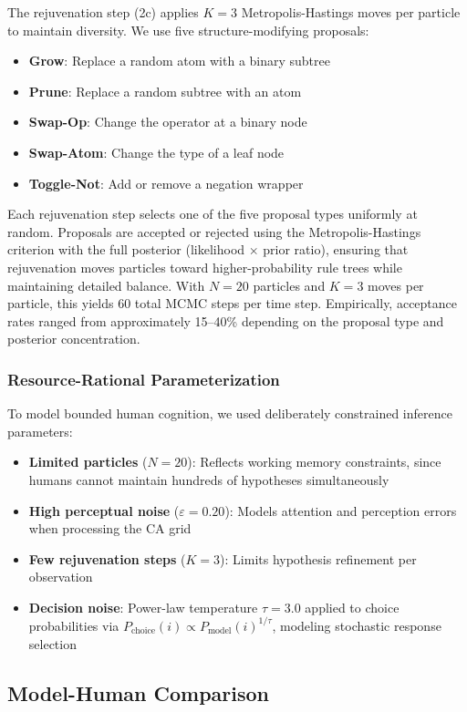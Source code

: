 \documentclass[10pt,letterpaper]{article}
\begin{document}
The rejuvenation step (2c) applies $K=3$ Metropolis-Hastings moves per particle to maintain diversity. We use five structure-modifying proposals:
\begin{itemize}
    \item \textbf{Grow}: Replace a random atom with a binary subtree
    \item \textbf{Prune}: Replace a random subtree with an atom
    \item \textbf{Swap-Op}: Change the operator at a binary node
    \item \textbf{Swap-Atom}: Change the type of a leaf node
    \item \textbf{Toggle-Not}: Add or remove a negation wrapper
\end{itemize}
Each rejuvenation step selects one of the five proposal types uniformly at random. Proposals are accepted or rejected using the Metropolis-Hastings criterion with the full posterior (likelihood $\times$ prior ratio), ensuring that rejuvenation moves particles toward higher-probability rule trees while maintaining detailed balance. With $N = 20$ particles and $K = 3$ moves per particle, this yields 60 total MCMC steps per time step. Empirically, acceptance rates ranged from approximately 15--40\% depending on the proposal type and posterior concentration.

\subsubsection{Resource-Rational Parameterization}
To model bounded human cognition, we used deliberately constrained inference parameters:
\begin{itemize}
    \item \textbf{Limited particles} ($N = 20$): Reflects working memory constraints, since humans cannot maintain hundreds of hypotheses simultaneously
    \item \textbf{High perceptual noise} ($\varepsilon = 0.20$): Models attention and perception errors when processing the CA grid
    \item \textbf{Few rejuvenation steps} ($K = 3$): Limits hypothesis refinement per observation
    \item \textbf{Decision noise}: Power-law temperature $\tau = 3.0$ applied to choice probabilities via $P_{\text{choice}}(i) \propto P_{\text{model}}(i)^{1/\tau}$, modeling stochastic response selection
\end{itemize}

\subsection{Model-Human Comparison}
\end{document}
